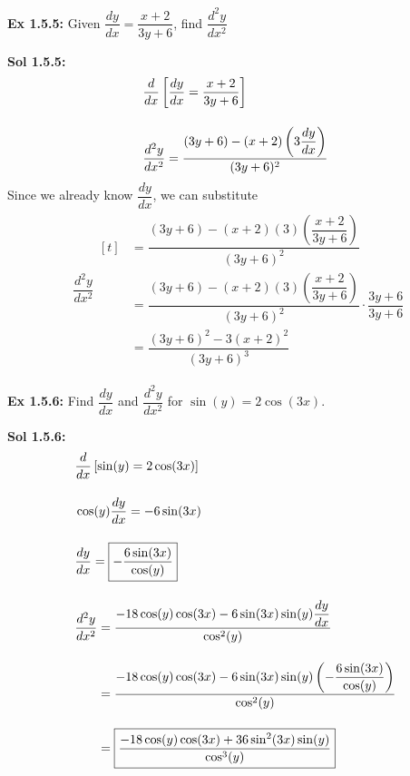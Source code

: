 \begin{tcolorbox}[example]
    \textbf{Ex 1.5.5: } Given $\dfrac{dy}{dx} = \dfrac{x + 2}{3y + 6}$, find $\dfrac{d^2y}{dx^2}$
\end{tcolorbox}
\begin{tcolorbox}[solution]
    \textbf{Sol 1.5.5: } \begin{align*}
        & \dfrac{d}{dx} \left[\dfrac{dy}{dx} = \dfrac{x + 2}{3y + 6}\right] \\[11pt]
        & \dfrac{d^2y}{dx^2} = \dfrac{(3y + 6) - (x + 2)\left(3\dfrac{dy}{dx}\right)}{(3y + 6)^2} 
    \end{align*}
    Since we already know $\dfrac{dy}{dx}$, we can substitute \begin{align*}
        & \dfrac{d^2y}{dx^2} \begin{aligned}[t]
            & = \dfrac{(3y + 6) - (x + 2)(3)\left(\dfrac{x + 2}{3y + 6}\right)}{(3y + 6)^2} \\[11pt]
            & = \dfrac{(3y + 6) - (x + 2)(3)\left(\dfrac{x + 2}{3y + 6}\right)}{(3y + 6)^2} \cdot \dfrac{3y + 6}{3y + 6} \\[11pt]
            & = \boxed{\dfrac{(3y + 6)^2 - 3(x + 2)^2}{(3y + 6)^3}}
        \end{aligned}
    \end{align*}
\end{tcolorbox} \vspace{11pt}

\begin{tcolorbox}[example]
    \textbf{Ex 1.5.6: } Find $\dfrac{dy}{dx}$ and $\dfrac{d^2y}{dx^2}$ for $\sin (y) = 2\cos (3x)$.
\end{tcolorbox}
\begin{tcolorbox}[solution]
    \textbf{Sol 1.5.6: } \begin{align*}
        & \dfrac{d}{dx} \left[\sin (y) = 2\cos (3x)\right] \\[11pt]
        & \cos (y)\dfrac{dy}{dx} = -6\sin (3x) \\[11pt]
        & \dfrac{dy}{dx} = \boxed{-\dfrac{6\sin (3x)}{\cos (y)}} \\[11pt]
        & \dfrac{d^2y}{dx^2} \begin{aligned}[t]
            & = \dfrac{-18\cos (y)\cos (3x) - 6\sin (3x)\sin (y)\dfrac{dy}{dx}}{\cos^2 (y)} \\[11pt]
            & = \dfrac{-18\cos (y)\cos (3x) - 6\sin (3x)\sin (y)\left(-\dfrac{6\sin (3x)}{\cos (y)}\right)}{\cos^2 (y)} \\[11pt]
            & = \boxed{\dfrac{-18\cos (y)\cos (3x) + 36\sin^2 (3x)\sin (y)}{\cos^3 (y)}}
        \end{aligned}
    \end{align*}
\end{tcolorbox}


